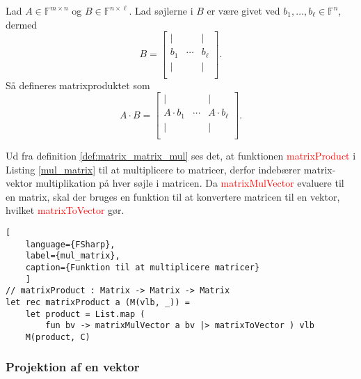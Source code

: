 \begin{definition}\label{def:matrix_matrix_mul}
    Lad $A \in \mathbb{F}^{m \times n}$ og $B \in \mathbb{F}^{n \times \ell}$. Lad søjlerne i $B$ er være givet ved $b_1, \ldots, b_\ell \in \mathbb{F}^n$, dermed
    \[
        B = \begin{bmatrix}
    | &  & | \\
    b_1 & \cdots & b_\ell \\
    | &  & | \\
\end{bmatrix}.
\]
Så defineres matrixproduktet som
\[
    A \cdot B = \begin{bmatrix}
        | &  & | \\
        A \cdot b_1 & \cdots & A \cdot b_\ell \\
        | &  & | \\
    \end{bmatrix}.
    \]
\end{definition}
Ud fra definition \ref{def:matrix_matrix_mul} ses det, at funktionen \textcolor{red}{matrixProduct} i Listing \ref{mul_matrix} til at multiplicere to matricer, derfor indebærer matrix-vektor multiplikation på hver søjle i matricen. Da \textcolor{red}{matrixMulVector} evaluere til en matrix, skal der bruges en funktion til at konvertere matricen til en vektor, hvilket \textcolor{red}{matrixToVector} gør.
\begin{lstlisting}[
    language={FSharp}, 
    label={mul_matrix}, 
    caption={Funktion til at multiplicere matricer}
    ]
// matrixProduct : Matrix -> Matrix -> Matrix
let rec matrixProduct a (M(vlb, _)) =
    let product = List.map (
        fun bv -> matrixMulVector a bv |> matrixToVector ) vlb
    M(product, C)
\end{lstlisting}
        
\subsubsection{Projektion af en vektor}

